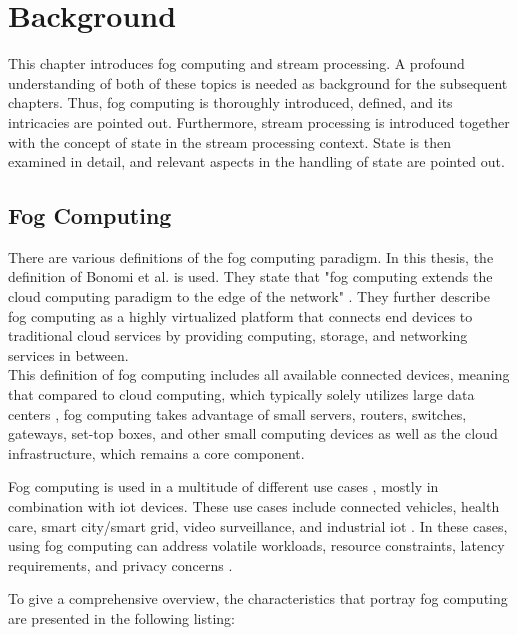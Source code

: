 \section{Background}
\label{lBackground}
This chapter introduces fog computing and stream processing. A profound understanding of both of these topics is needed as background for the subsequent chapters. Thus, fog computing is thoroughly introduced, defined, and its intricacies are pointed out. Furthermore, stream processing is introduced together with the concept of state in the stream processing context. State is then examined in detail, and relevant aspects in the handling of state are pointed out.

\subsection{Fog Computing}
\label{lFogComputing}
There are various definitions of the fog computing paradigm. In this thesis, the definition of Bonomi et al. \cite{Bonomi.2012} is used. They state that "fog computing extends the cloud computing paradigm to the edge of the network" \cite{Bonomi.2012}. They further describe fog computing as a highly virtualized platform that connects end devices to traditional cloud services by providing computing, storage, and networking services in between.\\
This definition of fog computing includes all available connected devices, meaning that compared to cloud computing, which typically solely utilizes large data centers \cite{Yousefpour.2019}, fog computing takes advantage of small servers, routers, switches, gateways, set-top boxes, and other small computing devices \cite{Yousefpour.2019} as well as the cloud infrastructure, which remains a core component.\par

Fog computing is used in a multitude of different use cases \cite{Yousefpour.2019}, mostly in combination with \gls{iot} devices. These use cases include connected vehicles, health care, smart city/smart grid, video surveillance, and industrial \gls{iot} \cite{Yousefpour.2019}. In these cases, using fog computing can address volatile workloads, resource constraints, latency requirements, and privacy concerns \cite{Yigitoglu.2017}.\par


To give a comprehensive overview, the characteristics that portray fog computing are presented in the following listing: 

